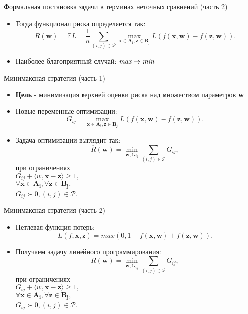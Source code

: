 \documentclass[11pt]{beamer}
\newcommand{\Rho}{%
	\mathcal{P}%
}
\begin{document}
\begin{frame}{Формальная постановка задачи в терминах неточных сравнений (часть 2)}

\begin{itemize}
	\item Тогда функционал риска определяется так:
	\[\overline{R}(\mathbf{w}) = \mathbb{\overline{E}}L = \frac{1}{n} \sum \limits_{(i,j) \in \Rho} \underset{\mathbf{x} \in \mathbf{A_i}, \mathbf{z} \in \mathbf{B_j}}{\operatorname{max}}L(f(\mathbf{x}, \mathbf{w}) - f(\mathbf{z}, \mathbf{w})).\]
	\item Наиболее благоприятный случай: \(\emph{max} \rightarrow \emph{min}\)
\end{itemize}

\end{frame}
\begin{frame}{Минимаксная стратегия (часть 1)}

\begin{itemize}
	\item \textbf{Цель} - минимизация верхней оценки риска над множеством параметров \textbf{w}
	\item Новые переменные оптимизации:
		\[G_{ij} = \underset{\mathbf{x} \in \mathbf{A_i}, \mathbf{z} \in \mathbf{B_j}}{\operatorname{max}} L (f (\mathbf{x}, \mathbf{w}) - f(\mathbf{z}, \mathbf{w})).\]
	\item Задача оптимизации выглядит так:\\
		\[\overline{R}(\mathbf{w}) = \underset{\mathbf{w}, G_{ij}}{\operatorname{min}} \sum \limits_{(i, j) \in \Rho} G_{ij},\] 
		при ограничениях\\
		\(G_{ij} + \langle w, \mathbf{x} - \mathbf{z} \rangle \geq 1,\) \\ 
		\(\forall \mathbf{x} \in \mathbf{A_i}, \forall \mathbf{z} \in \mathbf{B_j}, \) \\
		\(G_{ij} \succ 0, (i, j) \in \Rho\).
\end{itemize}

\end{frame}
\begin{frame}{Минимаксная стратегия (часть 2)}

\begin{itemize}
	\item Петлевая функция потерь:
		\[L(f, \mathbf{x}, \mathbf{z}) = max (0,1 - f(\mathbf{x}, \mathbf{w}) + f(\mathbf{z}, \mathbf{w})).\]
	\item Получаем задачу линейного программирования:
		\[\overline{R}(\mathbf{w}) = \underset{\mathbf{w}, G_{ij}}{\operatorname{min}} \sum \limits_{(i, j) \in \Rho} G_{ij},\]
		при ограничениях \\
		\(G_{ij} + \langle w, \mathbf{x} - \mathbf{z} \rangle \geq 1,\) \\ 
		\(\forall \mathbf{x} \in \mathbf{A_i}, \forall \mathbf{z} \in \mathbf{B_j}, \)\\
		\(G_{ij} \succ 0, (i, j) \in \Rho\).
\end{itemize}

\end{frame}
\end{document}
